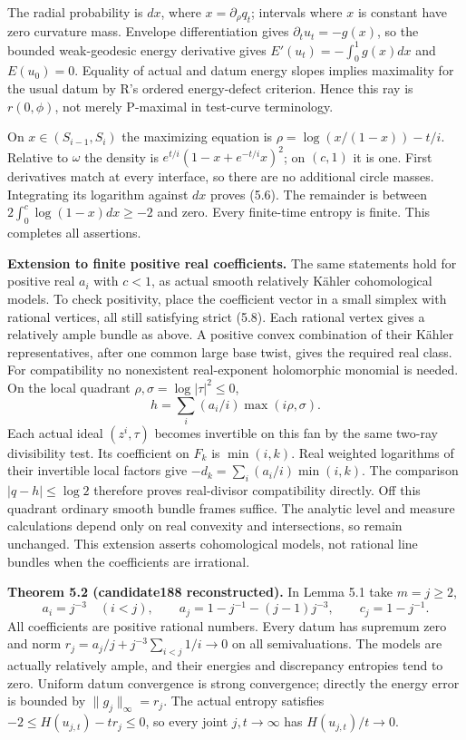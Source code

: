 \documentclass[
  11pt,
]{article}
\begin{document}
The radial probability is \(dx\), where \(x=\partial_\rho q_t\);
intervals where \(x\) is constant have zero curvature mass. Envelope
differentiation gives \(\partial_tu_t=-g(x)\), so the bounded
weak-geodesic energy derivative gives \(E'(u_t)=-\int_0^1g(x)dx\) and
\(E(u_0)=0\). Equality of actual and datum energy slopes implies
maximality for the usual datum by R's ordered energy-defect criterion.
Hence this ray is \(r(0,\phi)\), not merely P-maximal in test-curve
terminology.

On \(x\in(S_{i-1},S_i)\) the maximizing equation is
\(\rho=\log(x/(1-x))-t/i\). Relative to \(\omega\) the density is
\(e^{t/i}(1-x+e^{-t/i}x)^2\); on \((c,1)\) it is one. First derivatives
match at every interface, so there are no additional circle masses.
Integrating its logarithm against \(dx\) proves (5.6). The remainder is
between \(2\int_0^c\log(1-x)dx\geq-2\) and zero. Every finite-time
entropy is finite. This completes all assertions.

\textbf{Extension to finite positive real coefficients.} The same
statements hold for positive real \(a_i\) with \(c<1\), as actual smooth
relatively Kähler cohomological models. To check positivity, place the
coefficient vector in a small simplex with rational vertices, all still
satisfying strict (5.8). Each rational vertex gives a relatively ample
bundle as above. A positive convex combination of their Kähler
representatives, after one common large base twist, gives the required
real class. For compatibility no nonexistent real-exponent holomorphic
monomial is needed. On the local quadrant
\(\rho,\sigma=\log|\tau|^2\leq0\), \[
 h=\sum_i(a_i/i)\max(i\rho,\sigma).
\] Each actual ideal \((z^i,\tau)\) becomes invertible on this fan by
the same two-ray divisibility test. Its coefficient on \(F_k\) is
\(\min(i,k)\). Real weighted logarithms of their invertible local
factors give \(-d_k=\sum_i(a_i/i)\min(i,k)\). The comparison
\(|q-h|\leq\log2\) therefore proves real-divisor compatibility directly.
Off this quadrant ordinary smooth bundle frames suffice. The analytic
level and measure calculations depend only on real convexity and
intersections, so remain unchanged. This extension asserts cohomological
models, not rational line bundles when the coefficients are irrational.

\textbf{Theorem 5.2 (candidate188 reconstructed).} In Lemma 5.1 take
\(m=j\geq2\), \[
 a_i=j^{-3}\quad(i<j),\qquad
 a_j=1-j^{-1}-(j-1)j^{-3},\qquad c_j=1-j^{-1}.
\] All coefficients are positive rational numbers. Every datum has
supremum zero and norm \(r_j=a_j/j+j^{-3}\sum_{i<j}1/i\to0\) on all
semivaluations. The models are actually relatively ample, and their
energies and discrepancy entropies tend to zero. Uniform datum
convergence is strong convergence; directly the energy error is bounded
by \(\|g_j\|_\infty=r_j\). The actual entropy satisfies
\(-2\leq H(u_{j,t})-tr_j\leq0\), so every joint \(j,t\to\infty\) has
\(H(u_{j,t})/t\to0\).
\end{document}
